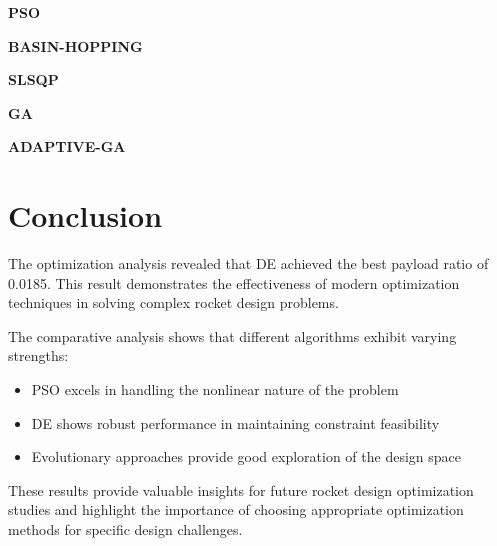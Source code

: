\documentclass[11pt]{article}
\begin{document}
\item \textbf{PSO}
\begin{itemize}
\end{itemize}
\item \textbf{BASIN-HOPPING}
\begin{itemize}
\end{itemize}
\item \textbf{SLSQP}
\begin{itemize}
\end{itemize}
\item \textbf{GA}
\begin{itemize}
\end{itemize}
\item \textbf{ADAPTIVE-GA}
\begin{itemize}
\end{itemize}

\section{Conclusion}
The optimization analysis revealed that DE achieved the best payload ratio of 0.0185. This result demonstrates the effectiveness of modern optimization techniques in solving complex rocket design problems.

The comparative analysis shows that different algorithms exhibit varying strengths:
\begin{itemize}
    \item PSO excels in handling the nonlinear nature of the problem \cite{pso_ascent_2013}
    \item DE shows robust performance in maintaining constraint feasibility \cite{de_ascent_2021}
    \item Evolutionary approaches provide good exploration of the design space \cite{evolutionary_rocket_2022}
\end{itemize}

These results provide valuable insights for future rocket design optimization studies and highlight the importance of choosing appropriate optimization methods for specific design challenges.


\end{document}
